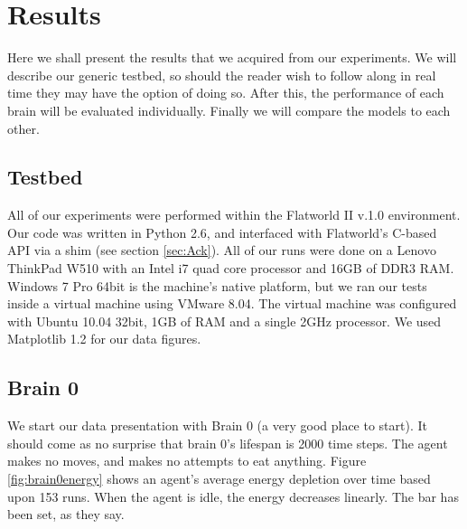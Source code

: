 \section{Results} \label{sec:Results}


Here we shall present the results that we acquired from our experiments. We will
describe our generic testbed, so should the reader wish to follow along in
real time they may have the option of doing so. After this, the performance 
of each brain will be evaluated individually. Finally we will compare the models
to each other.

\subsection{Testbed}
All of our experiments were performed within the Flatworld II v.1.0 
environment. Our code was written in Python 2.6, and interfaced with 
Flatworld's C-based API via a shim (see section \ref{sec:Ack}). All of our
runs were done on a Lenovo ThinkPad W510 with an Intel i7 quad core processor
and 16GB of DDR3 RAM. Windows 7 Pro 64bit is the machine's native platform,
but we ran our tests inside a virtual machine using VMware 8.04. The virtual
machine was configured with Ubuntu 10.04 32bit, 1GB of RAM and a single 2GHz
processor. We used Matplotlib 1.2 for our data figures.


\subsection{Brain 0}
We start our data presentation with Brain 0 (a very good place to start).
It should come as no surprise that brain 0's lifespan is 2000 time steps. 
The agent makes no moves, and makes no attempts to eat anything. 
Figure \ref{fig:brain0energy} shows an agent's average energy depletion over 
time based upon 153 runs. When the agent is idle, the energy decreases 
linearly. The bar has been set, as they say.

